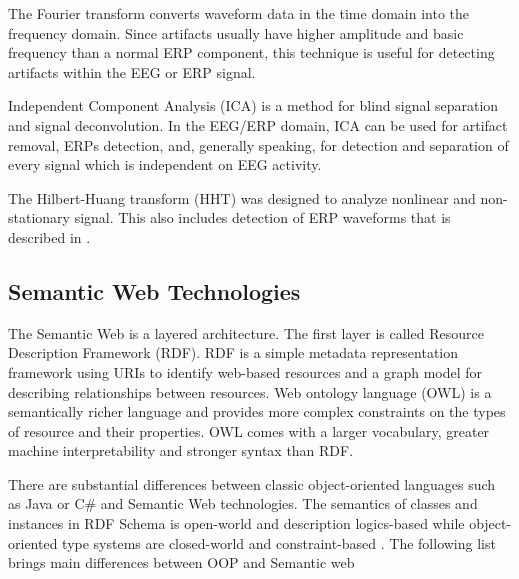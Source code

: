 \documentclass[a4paper,twoside]{article}
\begin{document}
The Fourier transform converts waveform data in the time domain into the frequency domain. Since artifacts usually have higher amplitude and basic frequency than a normal ERP component, this technique is useful for detecting artifacts within the EEG or ERP signal.

Independent Component Analysis (ICA) \cite{Hyv01} is a method for blind signal separation and signal deconvolution. In the EEG/ERP domain, ICA can be used for artifact removal, ERPs detection, and, generally speaking, for detection and separation of every signal which is independent on EEG activity.

The  Hilbert-Huang  transform  (HHT)  was  designed  to  analyze  nonlinear  and  non-stationary signal. This also includes detection of ERP waveforms that is described in \cite{Ciniburk11}.

\subsection{Semantic Web Technologies}

\noindent The Semantic Web is a layered architecture. The first layer is called Resource Description Framework (RDF). RDF is a simple metadata representation framework using URIs to identify web-based resources and a graph model for describing relationships between resources. Web ontology language (OWL) is a semantically richer language and provides more complex constraints on the types of resource and their properties. OWL comes with a larger vocabulary, greater machine interpretability and stronger syntax than RDF.

There are substantial differences between classic object-oriented languages such as Java or C\# and Semantic Web technologies. The semantics of classes and instances in RDF Schema is open-world and description logics-based while object-oriented type systems are closed-world and constraint-based \cite{Kalyanpur02}. The following list brings main differences between OOP and Semantic web \cite{Oren07}
\end{document}
